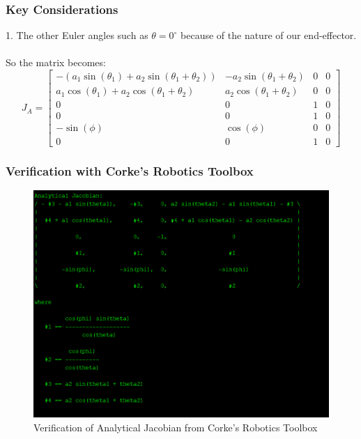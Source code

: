 \documentclass[12pt]{report}
\begin{document}
\subsubsection*{Key Considerations}
1. The other Euler angles such as $\theta=0^{\circ}$ because of the nature of our end-effector.
\\\\So the matrix becomes:\\
\begin{equation}
	J_A =
	\begin{bmatrix}
		-\left(a_1 \sin \left(\theta_1\right) + a_2 \sin \left(\theta_1 + \theta_2\right)\right) & -a_2 \sin \left(\theta_1 + \theta_2\right) & 0 & 0 \\
		a_1 \cos \left(\theta_1\right) + a_2 \cos \left(\theta_1 + \theta_2\right) & a_2 \cos \left(\theta_1 + \theta_2\right) & 0 & 0 \\
		0 & 0 & 1 & 0 \\
		0 & 0 & 1 & 0 \\
		-\sin (\phi) & \cos (\phi) & 0 & 0 \\
		0 & 0 & 1 & 0
	\end{bmatrix}
\end{equation}

\subsubsection{Verification with Corke's Robotics Toolbox}
\begin{figure}[H]
	\centering
	\includegraphics[scale=1]{run10} %
	\caption{Verification of Analytical Jacobian from Corke's Robotics Toolbox}
	\label{run10} %
\end{figure}
\end{document}
